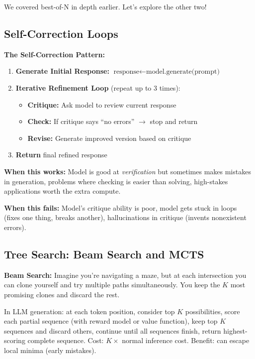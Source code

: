 \begin{chapterenv}
We covered best-of-N in depth earlier. Let's explore the other two!

\subsection{Self-Correction Loops}

\begin{infobox}
\textbf{The Self-Correction Pattern:}

\begin{enumerate}[nosep]
    \item \textbf{Generate Initial Response:} $\text{response} \leftarrow \text{model.generate(prompt)}$
    \item \textbf{Iterative Refinement Loop} (repeat up to 3 times):
    \begin{itemize}[nosep]
        \item[(a)] \textbf{Critique:} Ask model to review current response
        \item[(b)] \textbf{Check:} If critique says ``no errors'' $\rightarrow$ stop and return
        \item[(c)] \textbf{Revise:} Generate improved version based on critique
    \end{itemize}
    \item \textbf{Return} final refined response
\end{enumerate}

\textbf{When this works:} Model is good at \textit{verification} but sometimes makes mistakes in generation, problems where checking is easier than solving, high-stakes applications worth the extra compute.

\textbf{When this fails:} Model's critique ability is poor, model gets stuck in loops (fixes one thing, breaks another), hallucinations in critique (invents nonexistent errors).
\end{infobox}

\subsection{Tree Search: Beam Search and MCTS}

\textbf{Beam Search:} Imagine you're navigating a maze, but at each intersection you can clone yourself and try multiple paths simultaneously. You keep the $K$ most promising clones and discard the rest.

In LLM generation: at each token position, consider top $K$ possibilities, score each partial sequence (with reward model or value function), keep top $K$ sequences and discard others, continue until all sequences finish, return highest-scoring complete sequence. Cost: $K \times$ normal inference cost. Benefit: can escape local minima (early mistakes).


\end{chapterenv}
